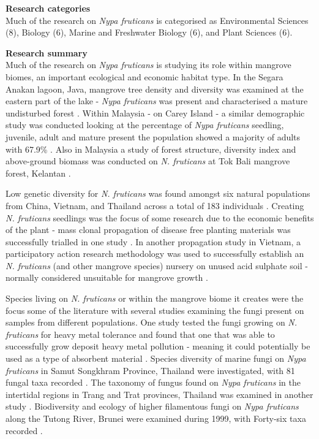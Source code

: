 \documentclass[]{book}
\theoremstyle{definition}
\theoremstyle{definition}
\theoremstyle{definition}
\theoremstyle{remark}
\begin{document}
\textbf{Research categories}\\
Much of the research on \emph{Nypa fruticans} is categorised as
Environmental Sciences (8), Biology (6), Marine and Freshwater Biology
(6), and Plant Sciences (6).

\textbf{Research summary}\\
Much of the research on \emph{Nypa fruticans} is studying its role
within mangrove biomes, an important ecological and economic habitat
type. In the Segara Anakan lagoon, Java, mangrove tree density and
diversity was examined at the eastern part of the lake - \emph{Nypa
fruticans} was present and characterised a mature undisturbed forest
\citep{Hinrichs_2008}. Within Malaysia - on Carey Island - a similar
demographic study was conducted looking at the percentage of \emph{Nypa
fruticans} seedling, juvenile, adult and mature present the population
showed a majority of adults with 67.9\% \citep{Aslezaeim_2010}. Also in
Malaysia a study of forest structure, diversity index and above-ground
biomass was conducted on \emph{N. fruticans} at Tok Bali mangrove
forest, Kelantan \citep{Kamaruzaman_2007}.

Low genetic diversity for \emph{N. fruticans} was found amongst six
natural populations from China, Vietnam, and Thailand across a total of
183 individuals \citep{Jian_2010}. Creating \emph{N. fruticans}
seedlings was the focus of some research due to the economic benefits of
the plant - mass clonal propagation of disease free planting materials
was successfully trialled in one study \citep{Mantiquilla_2015}. In
another propagation study in Vietnam, a participatory action research
methodology was used to successfully establish an \emph{N. fruticans}
(and other mangrove species) nursery on unused acid sulphate soil -
normally considered unsuitable for mangrove growth \citep{Nguyen_2016a}.

Species living on \emph{N. fruticans} or within the mangrove biome it
creates were the focus some of the literature with several studies
examining the fungi present on samples from different populations. One
study tested the fungi growing on \emph{N. fruticans} for heavy metal
tolerance and found that one that was able to successfully grow deposit
heavy metal pollution - meaning it could potentially be used as a type
of absorbent material \citep{Choo_2015}. Species diversity of marine
fungi on \emph{Nypa fruticans} in Samut Songkhram Province, Thailand
were investigated, with 81 fungal taxa recorded
\citep{Pilantanapak_2005}. The taxonomy of fungus found on \emph{Nypa
fruticans} in the intertidal regions in Trang and Trat provinces,
Thailand was examined in another study \citep{Suetrong_2015}.
Biodiversity and ecology of higher filamentous fungi on \emph{Nypa
fruticans} along the Tutong River, Brunei were examined during 1999,
with Forty-six taxa recorded \citep{Hyde_2006}.
\end{document}
